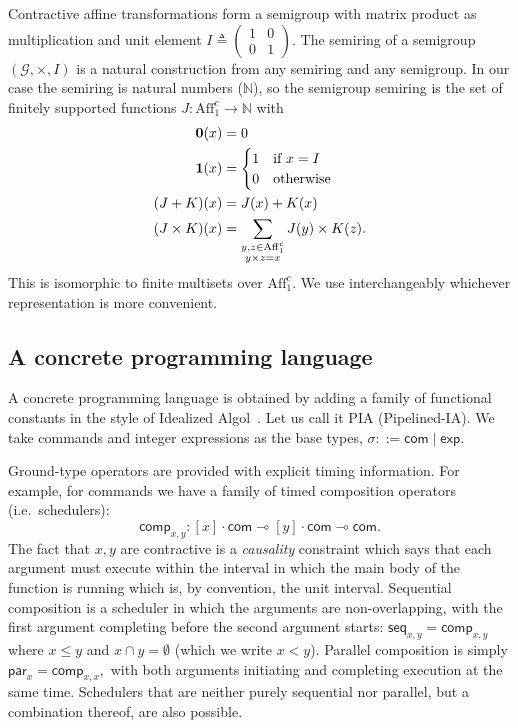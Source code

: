 \documentclass{article}
\newcommand{\defeq}{\triangleq}
\newcommand{\ringunit}{\textbf 1}
\newcommand{\ringzero}{\textbf 0}
\newcommand{\aff}{\mathrm{Aff}_1^c}
\newcommand{\lexpt}{\mathsf{exp}}
\newcommand{\lcomt}{\mathsf{com}}
\newcommand{\lcompc}{\mathsf{comp}}
\begin{document}
Contractive affine transformations form a semigroup with matrix product as multiplication and unit element
$
I\defeq
\left(
\begin{matrix}
1 & 0 \\
0 & 1
\end{matrix}
\right)
$.
The semiring of a semigroup $(\mathcal G,\times,I)$ is  a natural construction from any semiring and any semigroup. In our case the semiring is natural numbers ($\mathbb N$), so the semigroup semiring is the set of finitely supported functions $J:\aff\rightarrow \mathbb N$ with 
\begin{align}
	\ringzero (x) &= 0\label{eq:zero}\\
	\ringunit (x) &= \begin{cases}
	1 & \text{if } x = I\\
	0 & \text{otherwise}
	\end{cases}\label{eq:unit}\\
	(J+ K)(x) &= J(x)+K(x)\label{eq:add}\\
	(J\times K)(x) &= \sum_{\substack{y,z\in\aff\\y\times z=x}} J(y)\times K(z).\label{eq:mul}
\end{align}
This is isomorphic to finite multisets over $\aff$. We use interchangeably whichever representation is more convenient. 

\subsection{A concrete programming language}

A concrete programming language is obtained by adding a family of functional constants in the style of Idealized Algol~\cite{reynolds1997essence}. Let us call it PIA (Pipelined-IA). We take commands and integer expressions as the base types, 
$
\sigma::=\lcomt\mid\lexpt.
$

Ground-type operators are provided with explicit timing information. For example, for commands we have a family of timed composition operators (i.e.\ schedulers):
\[
\lcompc_{x,y}:[x]\cdot\lcomt\multimap [y]\cdot\lcomt\multimap\lcomt.
\]
The fact that $x,y$ are contractive is a \emph{causality} constraint which says that each argument must execute within the interval in which the main body of the function is running which is, by convention, the unit interval. Sequential composition is a scheduler in which the arguments are non-overlapping, with the first argument completing before the second argument starts:
$\mathsf{seq}_{x,y} = \lcompc_{x,y}$ where $  x\leq y$ and $x\cap y=\emptyset$ (which we write $x<y$). Parallel composition is simply
$
\mathsf{par}_x = \lcompc_{x,x},
$
with both arguments initiating and completing execution at the same time. Schedulers that are neither purely sequential nor parallel, but a combination thereof, are also possible. 
\end{document}

